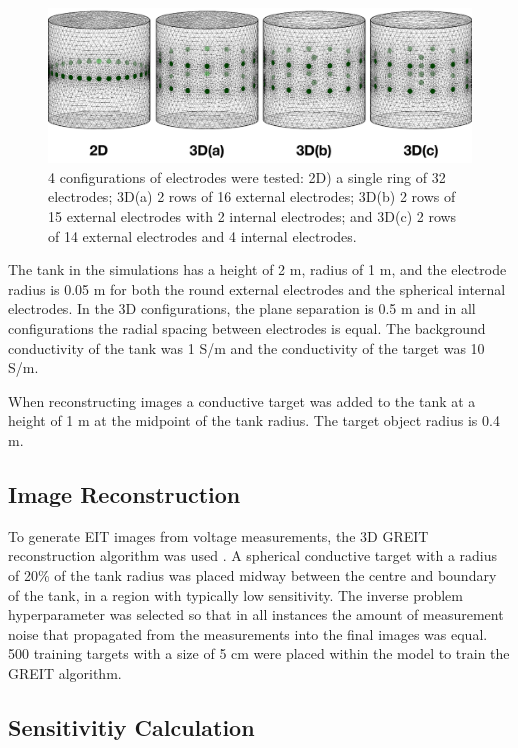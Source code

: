 \begin{figure}
\centering
\includegraphics[width=\textwidth]{chapter6-internal_electrodes/imgs/FEM_Comparison.pdf}
\caption[Internal electrode configurations]{4 configurations of electrodes were tested: 2D) a single ring of 32 electrodes; 
	3D(a) 2 rows of 16 external electrodes; 3D(b) 2 rows of 15 external electrodes with 2 internal electrodes; and 3D(c) 2 rows 
of 14 external electrodes and 4 internal electrodes.}
\label{fig:tank_FEM}
\end{figure}

The tank in the simulations has a height of 2 m, radius of 1 m, and the electrode radius
is 0.05 m for both the round external electrodes and the spherical internal electrodes.
In the 3D configurations, the plane separation is 0.5 m and in all configurations the radial
spacing between electrodes is equal.
The background conductivity of the tank was 1 S/m and the conductivity of the target was
10 S/m.

When reconstructing images a conductive target was added to the tank
at a height of 1 m at the midpoint of the tank radius. The target
object radius is 0.4 m.

\subsection{Image Reconstruction}

To generate EIT images from voltage measurements, the 3D GREIT
reconstruction algorithm
was used \parencite{grychtol_3d_2016}. A spherical
conductive target with a radius of 20\% of the tank radius
was placed midway between the centre and boundary
of the tank, in a region with typically low sensitivity.
The inverse problem hyperparameter
was selected so that in all instances the amount of measurement
noise that propagated from the measurements into the final images
was equal. 500 training targets with a size of 5 cm were placed within the model to train the GREIT 
algorithm. 

\subsection{Sensitivitiy Calculation}

